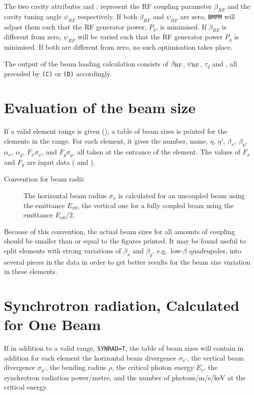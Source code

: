 The two  cavity attributes  and ,
represent the RF coupling parameter \(\beta_{RF}\) and
the cavity tuning angle \(\psi_{RF}\)
 respectively.
If both  \(\beta_{RF}\) and
\(\psi_{RF}\) are zero, {\tt BMPM} will adjust them such that
the RF generator power, \(P_g\), is minimised. If \(\beta_{RF}\) is
different from zero, \(\psi_{RF}\) will be varied such that the RF generator
power \(P_g\)  is minimised. If both are different from zero, no such
optimisation takes place.
 
The output of the beam loading calculation consists of
 \(\beta_{\rm RF}\),   \(\psi_{\rm RF}\), \(\tau_q\) and ,
all preceded by {\tt (C)} or {\tt (D)} accordingly.
 
\section{Evaluation of the beam size}
If a valid element range is given (),
a table of beam sizes is printed for the elements in the range.
For each element, it gives the number,
name, \(\eta\), \(\eta'\), \(\beta_x\),
\(\beta_y\), \(\alpha_x\), \(\alpha_y\), \(F_x\sigma_x\), and \(F_y \sigma_y\),
all taken at the entrance of the element. The values of \(F_x\) and
\(F_y\) are input data ( and ).
 
\begin{description}
 
\item[Convention for beam radii:] The horizontal beam radius
\(\sigma_x\) is calculated for an
uncoupled beam using the emittance \(E_{x0}\),
the vertical one for a fully coupled beam
using the emittance \(E_{x0}/2\).
 
\end{description}
 
Because of this convention, the actual beam sizes for all amounts of
coupling should be smaller than or equal to the figures printed. It
may be found useful to split elements with strong variations of
\(\beta_x\) and \(\beta_y\), e.g.\ low-\(\beta\) quadrupoles, into several
pieces in the data in order to get better results for the beam size
variation in these elements.
 
 
\section{Synchrotron radiation, Calculated for One Beam}
If in addition to a valid range, {\tt SYNRAD=T},
the table of beam sizes will contain in addition for each
element the horizontal beam
divergence \(\sigma_{x'}\), the vertical beam divergence \(\sigma_{y'}\),
the bending radius \(\rho\), the critical photon energy \(E_c\),
the synchrotron
radiation power/metre, and the number of photons/m/s/keV at the
critical energy.
 
